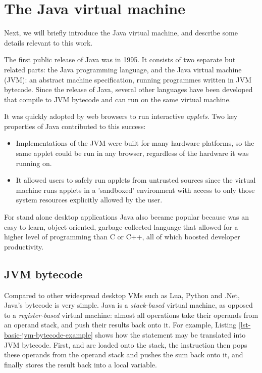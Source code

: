 \section{The Java virtual machine}
Next, we will briefly introduce the Java virtual machine, and describe some details relevant to this work.

The first public release of Java was in 1995. It consists of two separate but related parts: the Java programming language, and the Java virtual machine (JVM): an abstract machine specification, running programmes written in JVM bytecode. Since the release of Java, several other languages have been developed that compile to JVM bytecode and can run on the same virtual machine.

It was quickly adopted by web browsers to run interactive \emph{applets}. Two key properties of Java contributed to this success:
\begin{itemize}
    \item Implementations of the JVM were built for many hardware platforms, so the same applet could be run in any browser, regardless of the hardware it was running on.
    \item It allowed users to safely run applets from untrusted sources since the virtual machine runs applets in a 'sandboxed' environment with access to only those system resources explicitly allowed by the user.
\end{itemize}

For stand alone desktop applications Java also became popular because was an easy to learn, object oriented, garbage-collected language that allowed for a higher level of programming than C or C++, all of which boosted developer productivity.

\subsection{JVM bytecode}
Compared to other widespread desktop VMs such as Lua, Python and .Net, Java's bytecode is very simple. Java is a \emph{stack-based} virtual machine, as opposed to a \emph{register-based} virtual machine: almost all operations take their operands from an operand stack, and push their results back onto it. For example, Listing \ref{lst-basic-jvm-bytecode-example} shows how the statement  may be translated into JVM bytecode. First,  and  are loaded onto the stack, the  instruction then pops these operands from the operand stack and pushes the sum back onto it, and finally  stores the result back into a local variable.

